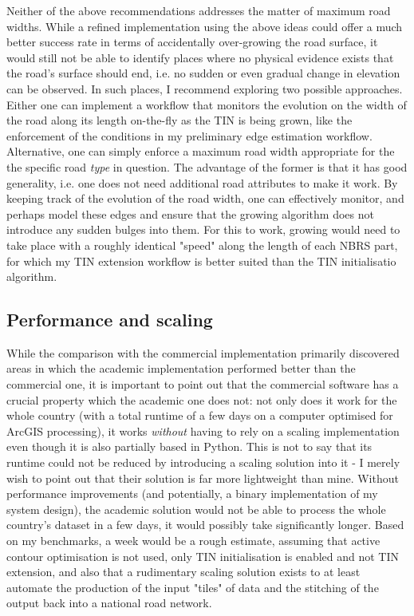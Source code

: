 Neither of the above recommendations addresses the matter of maximum road widths. While a refined implementation using the above ideas could offer a much better success rate in terms of accidentally over-growing the road surface, it would still not be able to identify places where no physical evidence exists that the road's surface should end, i.e. no sudden or even gradual change in elevation can be observed. In such places, I recommend exploring two possible approaches. Either one can implement a workflow that monitors the evolution on the width of the road along its length on-the-fly as the TIN is being grown, like the enforcement of the conditions in my preliminary edge estimation workflow. Alternative, one can simply enforce a maximum road width appropriate for the the specific road \textit{type} in question. The advantage of the former is that it has good generality, i.e. one does not need additional road attributes to make it work. By keeping track of the evolution of the road width, one can effectively monitor, and perhaps model these edges and ensure that the growing algorithm does not introduce any sudden bulges into them. For this to work, growing would need to take place with a roughly identical "speed" along the length of each NBRS part, for which my TIN extension workflow is better suited than the TIN initialisatio algorithm.

\subsection{Performance and scaling}
\label{sub:improvementsperformance}

While the comparison with the commercial implementation primarily discovered areas in which the academic implementation performed better than the commercial one, it is important to point out that the commercial software has a crucial property which the academic one does not: not only does it work for the whole country (with a total runtime of a few days on a computer optimised for ArcGIS processing), it works \textit{without} having to rely on a scaling implementation even though it is also partially based in Python. This is not to say that its runtime could not be reduced by introducing a scaling solution into it - I merely wish to point out that their solution is far more lightweight than mine. Without performance improvements (and potentially, a binary implementation of my system design), the academic solution would not be able to process the whole country's dataset in a few days, it would possibly take significantly longer. Based on my benchmarks, a week would be a rough estimate, assuming that active contour optimisation is not used, only TIN initialisation is enabled and not TIN extension, and also that a rudimentary scaling solution exists to at least automate the production of the input "tiles" of data and the stitching of the output back into a national road network.

